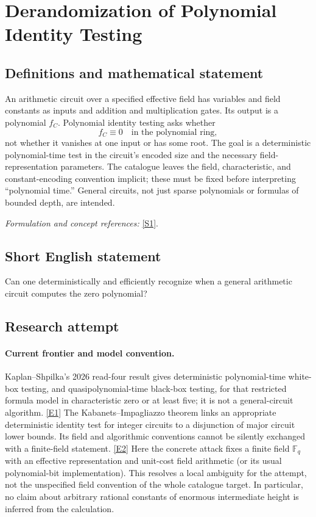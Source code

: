 \documentclass[11pt,a4paper]{article}
\numberwithin{equation}{section}
\newcommand{\F}{\mathbb{F}}
\newcommand{\sref}[2]{\hyperlink{source:#1:#2}{[S#2]}}
\newcommand{\eref}[2]{\hyperlink{extra:#1:#2}{[E#2]}}
\newif\ifshowcatalogue
\newcommand{\cataloguescope}[1]{\ifshowcatalogue
 \paragraph{Exact scope in the supplied catalogue.}
 \begin{quote}\small #1\end{quote}\fi}
\begin{document}
\setcounter{section}{0}
\section*{\texorpdfstring{Derandomization of Polynomial Identity Testing}{Derandomization of Polynomial Identity Testing}}\label{statement}
\subsection{Definitions and mathematical statement}
An arithmetic circuit over a specified effective field has variables and field constants as inputs and addition and multiplication gates. Its output is a polynomial $f_C$. Polynomial identity testing asks whether
\[
 f_C\equiv0\quad\text{in the polynomial ring},
\]
not whether it vanishes at one input or has some root. The goal is a deterministic polynomial-time test in the circuit's encoded size and the necessary field-representation parameters. The catalogue leaves the field, characteristic, and constant-encoding convention implicit; these must be fixed before interpreting ``polynomial time.'' General circuits, not just sparse polynomials or formulas of bounded depth, are intended.
\par\smallskip\textit{Formulation and concept references:} \sref{statement}{1}.
\cataloguescope{Determine whether polynomial identity testing for arithmetic circuits (deciding whether a given arithmetic circuit computes the identically zero polynomial) can be derandomized into deterministic polynomial time.}
\subsection{Short English statement}
Can one deterministically and efficiently recognize when a general arithmetic circuit computes the zero polynomial?
\subsection{Research attempt}

\paragraph{Current frontier and model convention.}
Kaplan--Shpilka's 2026 read-four result gives deterministic polynomial-time
white-box testing, and quasipolynomial-time black-box testing, for that
restricted formula model in characteristic zero or at least five; it is
not a general-circuit algorithm. \eref{statement}{1}
The Kabanets--Impagliazzo theorem links an appropriate deterministic
identity test for integer circuits to a disjunction of major circuit lower
bounds. Its field and algorithmic conventions cannot be silently exchanged
with a finite-field statement. \eref{statement}{2}
Here the concrete attack fixes a finite field $\F_q$ with an effective
representation and unit-cost field arithmetic (or its usual polynomial-bit
implementation). This resolves a local ambiguity for the attempt, not the
unspecified field convention of the whole catalogue target. In particular,
no claim about arbitrary rational constants of enormous intermediate height
is inferred from the calculation.
\end{document}
